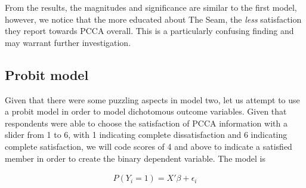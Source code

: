 \documentclass[a4paper]{article}
\begin{document}
From the results, the magnitudes and significance are similar to the first model, however, we notice that the more educated about The Seam, the \emph{less} satisfaction they report towards PCCA overall. This is a particularly confusing finding and may warrant further investigation. 

\subsection{Probit model}

Given that there were some puzzling aspects in model two, let us attempt to use a probit model in order to model dichotomous outcome variables. Given that respondents were able to choose the satisfaction of PCCA information with a slider from 1 to 6, with 1 indicating complete dissatisfaction and 6 indicating complete satisfaction, we will code scores of 4 and above to indicate a satisfied member in order to create the binary dependent variable. The model is

\begin{align}
	P(Y_{i}=1)=X'\beta+\epsilon_{i}
\end{align}
\end{document}
